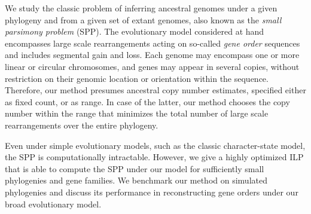     We study the classic problem of inferring ancestral genomes under a given phylogeny and from a given set of extant genomes, also known as the \emph{small parsimony problem} (SPP).
    The evolutionary model considered at hand encompasses large scale rearrangements acting on so-called \emph{gene order} sequences and includes segmental gain and loss. Each genome may encompass one or more linear or circular chromosomes, and genes may appear in several copies, without restriction on their genomic location or orientation within the sequence.
    Therefore, our method presumes ancestral copy number estimates, specified either as fixed count, or as range. 
    In case of the latter, our method chooses the copy number within the range that minimizes the total number of large scale rearrangements over the entire phylogeny. 
    
Even under simple evolutionary models, such as the classic character-state model, the SPP is computationally intractable.
However, we give a highly optimized ILP that is able to compute the SPP under our model for sufficiently small phylogenies and gene families. We benchmark our method on simulated phylogenies and discuss its performance in reconstructing gene orders under our broad evolutionary model. 

